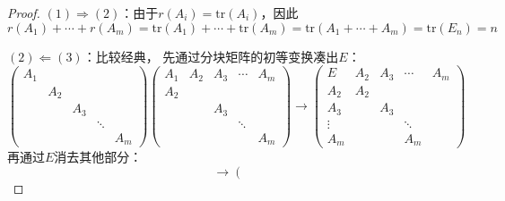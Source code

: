 \begin{proof}
  $(1) \Rightarrow (2)$：由于$r(A_i) = \mathrm{tr}(A_i)$，因此
  \begin{equation*}
    r(A_1) + \cdots + r(A_m) = \mathrm{tr}(A_1)+\cdots+ \mathrm{tr}(A_m) = \mathrm{tr}(A_1 + \cdots + A_m) = \mathrm{tr}(E_n) = n
  \end{equation*}

  $(2)\Leftarrow (3)$：比较经典，
  先通过分块矩阵的初等变换凑出$E$：
  \begin{equation*}
    \left(\begin{array}{ccccc}
            A_1 & & & & \\
                & A_2 & & & \\
                & & A_3 & & \\
                & & & \ddots & \\
                & & & & A_m
          \end{array}\right)\left(\begin{array}{ccccc}
                                    A_1 & A_2 & A_3 & \cdots & A_m \\
                                    A_2 & & & \\
                                        & & A_3 & & \\
                                        & & & \ddots & \\
                                        & & & & A_m
                                  \end{array}\right) \rightarrow\left(\begin{array}{ccccc}
                                                                        E & A_2 & A_3 & \cdots & A_m \\
                                                                        A_2 & A_2 & & & \\
                                                                        A_3 & & A_3 & & \\
                                                                        \vdots & & & \ddots & \\
                                                                        A_m & & & A_m
                                                                      \end{array}\right)
  \end{equation*}
  再通过$E$消去其他部分：
  \begin{equation*}
    \rightarrow\left(\begin{array}{ccccc}

\end{array}
\end{equation*}
\end{proof}
